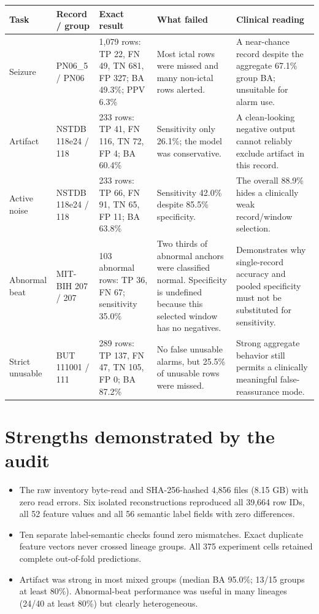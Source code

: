 \documentclass[9pt]{extarticle}
\begin{document}
\begin{table}[h!]
\footnotesize
\setlength{\tabcolsep}{3pt}
\begin{tabularx}{\linewidth}{@{}L{0.82in}L{0.78in}L{1.58in}Y L{1.58in}@{}}
\toprule
Task & Record / group & Exact result & What failed & Clinical reading \\
\midrule
Seizure & PN06\_5 / PN06 & 1,079 rows: TP 22, FN 49, TN 681, FP 327; BA 49.3\%; PPV 6.3\% & Most ictal rows were missed and many non-ictal rows alerted. & A near-chance record despite the aggregate 67.1\% group BA; unsuitable for alarm use. \\
Artifact & NSTDB 118e24 / 118 & 233 rows: TP 41, FN 116, TN 72, FP 4; BA 60.4\% & Sensitivity only 26.1\%; the model was conservative. & A clean-looking negative output cannot reliably exclude artifact in this record. \\
Active noise & NSTDB 118e24 / 118 & 233 rows: TP 66, FN 91, TN 65, FP 11; BA 63.8\% & Sensitivity 42.0\% despite 85.5\% specificity. & The overall 88.9\% hides a clinically weak record/window selection. \\
Abnormal beat & MIT-BIH 207 / 207 & 103 abnormal rows: TP 36, FN 67; sensitivity 35.0\% & Two thirds of abnormal anchors were classified normal. Specificity is undefined because this selected window has no negatives. & Demonstrates why single-record accuracy and pooled specificity must not be substituted for sensitivity. \\
Strict unusable & BUT 111001 / 111 & 289 rows: TP 137, FN 47, TN 105, FP 0; BA 87.2\% & No false unusable alarms, but 25.5\% of unusable rows were missed. & Strong aggregate behavior still permits a clinically meaningful false-reassurance mode. \\
\bottomrule
\end{tabularx}
\end{table}

\section*{Strengths demonstrated by the audit}
\begin{itemize}
\item The raw inventory byte-read and SHA-256-hashed 4,856 files (8.15 GB) with zero read errors. Six isolated reconstructions reproduced all 39,664 row IDs, all 52 feature values and all 56 semantic label fields with zero differences.
\item Ten separate label-semantic checks found zero mismatches. Exact duplicate feature vectors never crossed lineage groups. All 375 experiment cells retained complete out-of-fold predictions.
\item Artifact was strong in most mixed groups (median BA 95.0\%; 13/15 groups at least 80\%). Abnormal-beat performance was useful in many lineages (24/40 at least 80\%) but clearly heterogeneous.
\end{itemize}
\end{document}
